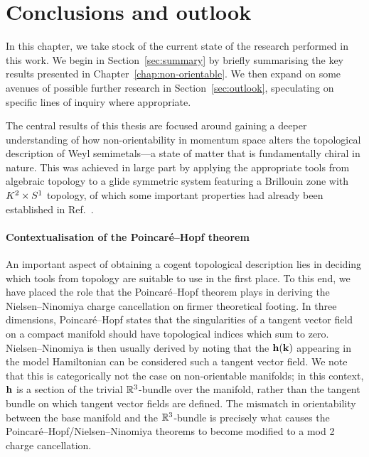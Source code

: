 \chapter{Conclusions and outlook}\label{chap:conclusions}

In this chapter, we take stock of the current state of the research performed in this work. We begin in Section~\ref{sec:summary} by briefly summarising the key results presented in Chapter~\ref{chap:non-orientable}. We then expand on some avenues of possible further research in Section~\ref{sec:outlook}, speculating on specific lines of inquiry where appropriate.

\label{sec:summary}

The central results of this thesis are focused around gaining a deeper understanding of how non-orientability in momentum space alters the topological description of Weyl semimetals---a state of matter that is fundamentally chiral in nature. This was achieved in large part by applying the appropriate tools from algebraic topology to a glide symmetric system featuring a Brillouin zone with $K^2\times S^1$ topology, of which some important properties had already been established in Ref.~\cite{Fonseca-Vaidya_nonorientable}.

\subsubsection{Contextualisation of the Poincaré--Hopf theorem}

An important aspect of obtaining a cogent topological description lies in deciding which tools from topology are suitable to use in the first place. To this end, we have placed the role that the Poincaré--Hopf theorem plays in deriving the Nielsen--Ninomiya charge cancellation on firmer theoretical footing. In three dimensions, Poincaré--Hopf states that the singularities of a tangent vector field on a compact manifold should have topological indices which sum to zero. Nielsen--Ninomiya is then usually derived by noting that the $\vb{h}(\vb{k})$ appearing in the model Hamiltonian can be considered such a tangent vector field. We note that this is categorically not the case on non-orientable manifolds; in this context, $\vb{h}$ is a section of the trivial $\mathbb{R}^3$-bundle over the manifold, rather than the tangent bundle on which tangent vector fields are defined. The mismatch in orientability between the base manifold and the $\mathbb{R}^3$-bundle is precisely what causes the Poincaré--Hopf/Nielsen--Ninomiya theorems to become modified to a mod 2 charge cancellation.

